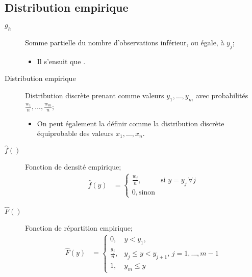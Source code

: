 \documentclass[10pt, french]{article}
\begin{document}
\begin{multicols*}{2}
\subsection{Distribution empirique}
\begin{distributions}[Notation]
\begin{description}
	\item[$g_{h}$]	Somme partielle du nombre d'observations inférieur, ou égale, à $y_{j}$;
		\begin{itemize}[leftmargin = *]
		\item	Il s'ensuit que .
		\end{itemize}
	\item[Distribution empirique]	Distribution discrète prenant comme valeurs $y_{1}, \dots, y_{m}$ avec probabilités $\frac{w_{1}}{n}, \dots, \frac{w_{m}}{n}$;
		\begin{itemize}[leftmargin = *]
		\item	On peut également la définir comme la distribution discrète équiprobable des valeurs $x_{1}, \dots, x_{n}$.
		\end{itemize}
	\item[$\hat{f}()$]	Fonction de densité empirique;	
		\begin{align*}
		\hat{f}(y)
		&=	\begin{cases}
			\frac{w_{j}}{n},	&	\text{si } y = y_{j} \, \forall j	\\
			0,	\text{sinon}
			\end{cases}
		\end{align*}			
	\item[$\hat{F}()$]	Fonction de répartition empirique;
		\begin{align*}
		\hat{F}(y)
		&=	\begin{cases}
			0,	&	y	<	y_{1},	\\
			\frac{g_{j}}{n},	&	y_{j}	\leq	y	<	y_{j + 1}, \, j	=	1, \dots, m - 1	\\
			1,	&	y_{m}	\leq	y
			\end{cases}
		\end{align*}		

\end{description}
\end{distributions}
\end{multicols*}
\end{document}
